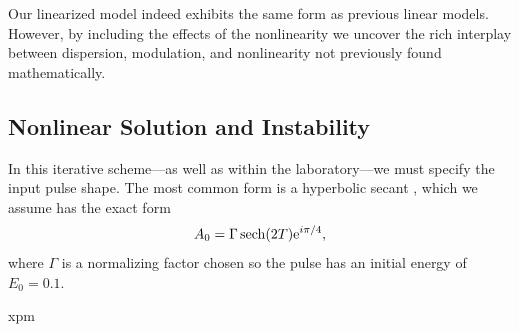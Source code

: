 \documentclass[10pt,twocolumn,a4paper]{article}
\let\originalleft\left
\let\originalright\right
\renewcommand{\left}{\mathopen{}\mathclose\bgroup\originalleft}
\renewcommand{\right}{\aftergroup\egroup\originalright}
\DeclareMathOperator{\sech}{sech}
\begin{document}
Our linearized model indeed exhibits the same form as previous linear models. However, by including the effects of the nonlinearity we uncover the rich interplay between dispersion, modulation, and nonlinearity not previously found mathematically.

\subsection{Nonlinear Solution and Instability}
\label{sec:nlresults}

In this iterative scheme---as well as within the laboratory---we must specify the input pulse shape. The most common form is a hyperbolic secant \cite{coen1997, finot2008, mitschke1986, rothenberg1989b, tomlinson1984}, which we assume has the exact form
\begin{align}
	A_0 = \Gamma \sech \left( 2 T \right) \textrm{e}^{i \pi / 4},
\end{align}
where $\Gamma$ is a normalizing factor chosen so the pulse has an initial energy of $E_0 = 0.1$.



xpm \cite{agrawal2013, agrawal1987, agrawal1989}
\end{document}
